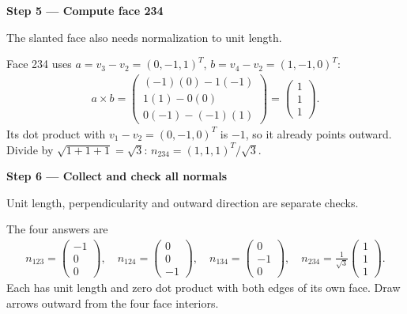 \documentclass[letterpaper,11pt,english,openany,oneside]{jupyterBook}
\begin{document}
\par

\par\medskip{}
{\color{QuizStepRed}\bfseries Step 5 — Compute face 234}\par\smallskip

\sphinxAtStartPar
{} The slanted face also needs normalization to unit length.

\sphinxAtStartPar
Face 234 uses {\color{QuizMathBlue} \(a=v_3-v_2=(0,-1,1)^T\)}, {\color{QuizMathBlue} \(b=v_4-v_2=(1,-1,0)^T\)}:
{\color{QuizMathBlue} \begin{equation*}
\begin{split}
a\times b=\begin{pmatrix}(-1)(0)-1(-1)\\1(1)-0(0)\\0(-1)-(-1)(1)\end{pmatrix}
=\begin{pmatrix}1\\1\\1\end{pmatrix}.
\end{split}
\end{equation*}}
\sphinxAtStartPar
Its dot product with {\color{QuizMathBlue} \(v_1-v_2=(0,-1,0)^T\)} is {\color{QuizMathBlue} \(-1\)}, so it already points outward. Divide by {\color{QuizMathBlue} \(\sqrt{1+1+1}=\sqrt3\)}: {\color{QuizMathBlue} \(n_{234}=(1,1,1)^T/\sqrt3\)}.

\par

\par\medskip{}
{\color{QuizStepRed}\bfseries Step 6 — Collect and check all normals}\par\smallskip

\sphinxAtStartPar
{} Unit length, perpendicularity and outward direction are separate checks.

\sphinxAtStartPar
The four answers are
{\color{QuizMathBlue} \begin{equation*}
\begin{split}
n_{123}=\begin{pmatrix}-1\\0\\0\end{pmatrix},\quad n_{124}=\begin{pmatrix}0\\0\\-1\end{pmatrix},\quad
n_{134}=\begin{pmatrix}0\\-1\\0\end{pmatrix},\quad n_{234}=\frac1{\sqrt3}\begin{pmatrix}1\\1\\1\end{pmatrix}.
\end{split}
\end{equation*}}
\sphinxAtStartPar
Each has unit length and zero dot product with both edges of its own face. Draw arrows outward from the four face interiors.
\end{document}
